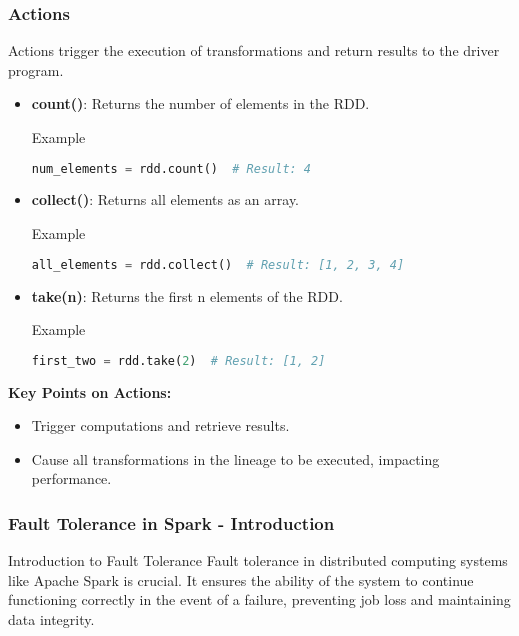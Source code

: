 \documentclass[aspectratio=169]{beamer}
\begin{document}
\begin{frame}[fragile]
    \frametitle{Actions}
    Actions trigger the execution of transformations and return results to the driver program.

    \begin{itemize}
        \item \textbf{count()}: Returns the number of elements in the RDD.
        \begin{block}{Example}
        \begin{lstlisting}[language=Python]
num_elements = rdd.count()  # Result: 4
        \end{lstlisting}
        \end{block}

        \item \textbf{collect()}: Returns all elements as an array.
        \begin{block}{Example}
        \begin{lstlisting}[language=Python]
all_elements = rdd.collect()  # Result: [1, 2, 3, 4]
        \end{lstlisting}
        \end{block}

        \item \textbf{take(n)}: Returns the first n elements of the RDD.
        \begin{block}{Example}
        \begin{lstlisting}[language=Python]
first_two = rdd.take(2)  # Result: [1, 2]
        \end{lstlisting}
        \end{block}
    \end{itemize}
    
    \textbf{Key Points on Actions:}
    \begin{itemize}
        \item Trigger computations and retrieve results.
        \item Cause all transformations in the lineage to be executed, impacting performance.
    \end{itemize}
\end{frame}

\begin{frame}[fragile]
    \frametitle{Fault Tolerance in Spark - Introduction}
    \begin{block}{Introduction to Fault Tolerance}
        Fault tolerance in distributed computing systems like Apache Spark is crucial. 
        It ensures the ability of the system to continue functioning correctly in the event of a failure, 
        preventing job loss and maintaining data integrity.
    \end{block}
\end{frame}
\end{document}
